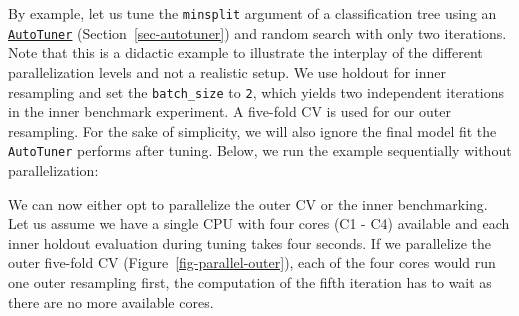 By example, let us tune the \texttt{minsplit} argument of a
classification tree using an
\href{https://mlr3tuning.mlr-org.com/reference/AutoTuner.html}{\texttt{AutoTuner}}
(Section~\ref{sec-autotuner}) and random search with only two
iterations. Note that this is a didactic example to illustrate the
interplay of the different parallelization levels and not a realistic
setup. We use holdout for inner resampling and set the
\texttt{batch\_size} to \texttt{2}, which yields two independent
iterations in the inner benchmark experiment. A five-fold CV is used for
our outer resampling. For the sake of simplicity, we will also ignore
the final model fit the \texttt{AutoTuner} performs after tuning. Below,
we run the example sequentially without parallelization:

\begin{Shaded}
\begin{Highlighting}[]
\SpecialCharTok{::}\NormalTok{(}\NormalTok{)}

\OtherTok{=} \NormalTok{(}\NormalTok{,}
   \NormalTok{(}\NormalTok{, }\NormalTok{))}

\OtherTok{=} \NormalTok{(}\NormalTok{(}\NormalTok{, } \NormalTok{),}
\NormalTok{(}\NormalTok{), }\NormalTok{(}\NormalTok{), }\NormalTok{)}

\OtherTok{=} \NormalTok{(}\NormalTok{(}\NormalTok{(}\NormalTok{, } \NormalTok{))}
\end{Highlighting}
\end{Shaded}

We can now either opt to parallelize the outer CV or the inner
benchmarking. Let us assume we have a single CPU with four cores (C1 -
C4) available and each inner holdout evaluation during tuning takes four
seconds. If we parallelize the outer five-fold CV
(Figure~\ref{fig-parallel-outer}), each of the four cores would run one
outer resampling first, the computation of the fifth iteration has to
wait as there are no more available cores.

